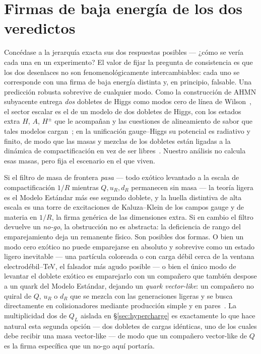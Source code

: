 \documentclass[11pt,a4paper]{article}
\begin{document}
\section{Firmas de baja energ\'ia de los dos veredictos}\label{sec:signatures}
Conc\'edase a la jerarqu\'ia exacta sus dos respuestas posibles --- ¿c\'omo se ver\'ia cada
una en un experimento? El valor de fijar la pregunta de consistencia es que los dos
desenlaces no son fenomenol\'ogicamente intercambiables: cada uno se corresponde con una
firma de baja energ\'ia distinta y, en principio, falsable. Una predicci\'on robusta
sobrevive de cualquier modo. Como la construcci\'on de AHMN subyacente entrega \emph{dos}
dobletes de Higgs como modos cero de l\'inea de Wilson~\cite{AHMN}, el sector escalar es el
de un modelo de dos dobletes de Higgs, con los estados extra $H$, $A$, $H^\pm$ que le
acompa\~nan y las cuestiones de alineamiento de sabor que tales modelos
cargan~\cite{2HDM}; en la unificaci\'on gauge--Higgs su potencial es radiativo y finito, de
modo que las masas y mezclas de los dobletes est\'an ligadas a la din\'amica de
compactificaci\'on en vez de ser libres~\cite{Hosotani}. Nuestro an\'alisis no calcula esas
masas, pero fija el escenario en el que viven.

Si el filtro de masa de frontera \emph{pasa} --- todo ex\'otico levantado a la escala de
compactificaci\'on $1/R$ mientras $Q,u_R,d_R$ permanecen sin masa --- la teor\'ia ligera es
el Modelo Est\'andar m\'as ese segundo doblete, y la huella distintiva de alta escala es una
torre de excitaciones de Kaluza--Klein de los campos gauge y de materia en $1/R$, la
firma gen\'erica de las dimensiones extra. Si en cambio el filtro devuelve un \emph{no-go},
la obstrucci\'on no es abstracta: la deficiencia de rango del emparejamiento deja un remanente
f\'isico. Son posibles dos formas. O bien un modo cero ex\'otico no puede emparejarse en
absoluto y sobrevive como un estado ligero inevitable --- una part\'icula coloreada o con
carga d\'ebil cerca de la ventana electrod\'ebil--TeV, el falsador m\'as agudo posible --- o
bien el \'unico modo de levantar el doblete ex\'otico es emparejarlo con un compa\~nero que
tambi\'en despose a un quark del Modelo Est\'andar, dejando un \emph{quark vector-like}: un
compa\~nero no quiral de $Q$, $u_R$ o $d_R$ que se mezcla con las generaciones ligeras y se
busca directamente en colisionadores mediante producci\'on simple y en pares~\cite{VLQ}. La
multiplicidad dos de $Q_L$ aislada en \S\ref{sec:hypercharge} es exactamente lo que hace
natural esta segunda opci\'on --- dos dobletes de cargas id\'enticas, uno de los cuales debe
recibir una masa vector-like --- de modo que un compa\~nero vector-like de $Q$ es la firma
espec\'ifica que un no-go aqu\'i portar\'ia.
\end{document}
